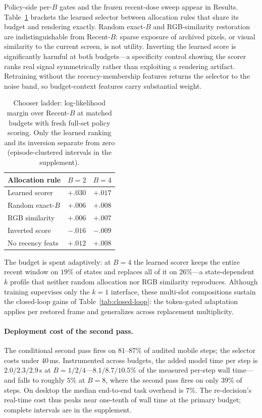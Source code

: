 \documentclass[letterpaper]{article} %
\begin{document}
Policy-side per-$B$ gates and the frozen recent-dose sweep appear in Results.
Table~\ref{tab:chooser} brackets the learned selector between allocation
rules that share its budget and rendering exactly. Random exact-$B$ and
RGB-similarity restoration are indistinguishable from Recent-$B$: sparse
exposure of archived pixels, or visual similarity to the current screen, is
not utility. Inverting the learned score is significantly harmful at both
budgets---a specificity control showing the scorer ranks real signal
symmetrically rather than exploiting a rendering artifact. Retraining
without the recency-membership features returns the selector to the noise
band, so budget-context features carry substantial weight.

\begin{table}[t]
\centering
{\small
\setlength{\tabcolsep}{4.0pt}
\begin{tabular}{@{}lcc@{}}
\toprule
Allocation rule & $B{=}2$ & $B{=}4$ \\
\midrule
Learned scorer & $+.030$ & $+.017$ \\
Random exact-$B$ & $+.006$ & $+.008$ \\
RGB similarity & $+.006$ & $+.007$ \\
Inverted score & $-.016$ & $-.009$ \\
No recency feats & $+.012$ & $+.008$ \\
\bottomrule
\end{tabular}
}
\caption{Chooser ladder: log-likelihood margin over Recent-$B$ at matched
budgets with fresh full-set policy scoring. Only the learned ranking and
its inversion separate from zero (episode-clustered intervals in the
supplement).}
\label{tab:chooser}
\end{table}

The budget is spent adaptively: at $B{=}4$ the learned scorer keeps the
entire recent window on $19\%$ of states and replaces all of it on
$26\%$---a state-dependent $k$ profile that neither random allocation nor
RGB similarity reproduces. Although training supervises only the
$k{=}1$ interface, these multi-slot compositions sustain the closed-loop
gains of Table~\ref{tab:closed-loop}: the token-gated adaptation applies
per restored frame and generalizes across replacement multiplicity.

\paragraph{Deployment cost of the second pass.}
The conditional second pass fires on
$81$--$87\%$ of audited mobile steps; the selector costs under $40$\,ms. Instrumented across budgets, the added model time per
step is $2.0/2.3/2.9$\,s at $B{=}1/2/4$---$8.1/8.7/10.5\%$ of the measured
per-step wall time---and falls to roughly $5\%$ at $B{=}8$, where the
second pass fires on only $39\%$ of steps. On desktop the median
end-to-end task overhead is $7\%$. The re-decision's real-time cost thus
peaks near one-tenth of wall time at the primary budget; complete
intervals are in the supplement.
\end{document}
